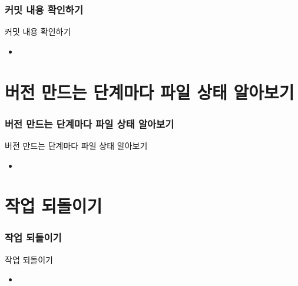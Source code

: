 \documentclass[aspectratio=1610,20pt,xcolor=pdftex,dvipsnames,table,handout]{beamer}
\begin{document}
		\begin{frame} [t,plain]
		\frametitle{커밋 내용 확인하기}
			\begin{block} {커밋 내용 확인하기 }
			\setlength{\leftmargini}{2em}			
			\begin{itemize}
				\item 
			\end{itemize}
			\end{block}						
		\end{frame}						

		\section{버전 만드는 단계마다 파일 상태 알아보기}

		\begin{frame} [t,plain]
		\frametitle{버전 만드는 단계마다 파일 상태 알아보기}
			\begin{block} {버전 만드는 단계마다 파일 상태 알아보기}
			\setlength{\leftmargini}{2em}			
			\begin{itemize}
				\item 
			\end{itemize}
			\end{block}						
		\end{frame}						

		\section{작업 되돌이기}

		\begin{frame} [t,plain]
		\frametitle{작업 되돌이기}
			\begin{block} {작업 되돌이기}
			\setlength{\leftmargini}{2em}			
			\begin{itemize}
				\item 
			\end{itemize}
			\end{block}						
		\end{frame}						
\end{document}
